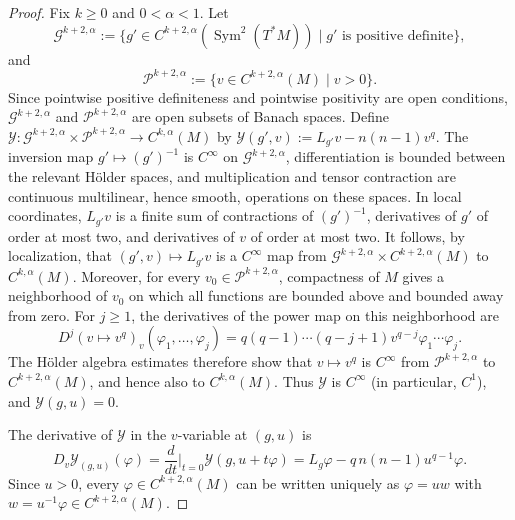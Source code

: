 \documentclass[12pt,oneside,a4paper]{article}
\theoremstyle{mytheorem}
\theoremstyle{remark}
\theoremstyle{definition}
\begin{document}
\begin{proof}
Fix \(k\ge 0\) and \(0<\alpha<1\). Let
\[
\mathcal G^{k+2,\alpha}
:=
\bigl\{g'\in C^{k+2,\alpha}(\operatorname{Sym}^2(T^*M))
\mid g' \text{ is positive definite}\bigr\},
\]
and
\[
\mathcal P^{k+2,\alpha}
:=
\bigl\{v\in C^{k+2,\alpha}(M)\mid v>0\bigr\}.
\]
Since pointwise positive definiteness and pointwise positivity are open conditions,
\(\mathcal G^{k+2,\alpha}\) and \(\mathcal P^{k+2,\alpha}\) are open subsets of Banach spaces.
Define
\(\mathcal Y\colon\mathcal G^{k+2,\alpha}\times
\mathcal P^{k+2,\alpha}\to  C^{k,\alpha}(M)\)
by
\(
\mathcal Y(g',v):=L_{g'}v-n(n-1)v^q.
\)
The inversion map $g'\mapsto(g')^{-1}$ is $C^\infty$ on
$\mathcal G^{k+2,\alpha}$, differentiation is bounded between the relevant
H\"older spaces, and multiplication and tensor contraction are continuous
multilinear, hence smooth, operations on these spaces. In local coordinates,
$L_{g'}v$ is a finite sum of contractions
of $(g')^{-1}$, derivatives of $g'$ of order at most two, and derivatives of
$v$ of order at most two. It follows, by localization, that
\((g',v)\longmapsto L_{g'}v\)
is a $C^\infty$ map from
$\mathcal G^{k+2,\alpha}\times C^{k+2,\alpha}(M)$ to $C^{k,\alpha}(M)$.
Moreover, for every $v_0\in\mathcal P^{k+2,\alpha}$, compactness of $M$ gives
a neighborhood of $v_0$ on which all functions are bounded above and bounded
away from zero. For $j\geq1$, the derivatives of the power map on this
neighborhood are
\[
D^j(v\mapsto v^q)_v(\varphi_1,\ldots,\varphi_j)
=q(q-1)\cdots(q-j+1)v^{q-j}\varphi_1\cdots\varphi_j.
\]
The H\"older algebra estimates therefore show that $v\mapsto v^q$ is
$C^\infty$ from $\mathcal P^{k+2,\alpha}$ to $C^{k+2,\alpha}(M)$, and hence
also to $C^{k,\alpha}(M)$. Thus $\mathcal Y$ is $C^\infty$ (in particular,
$C^1$), and $\mathcal Y(g,u)=0$.

The derivative of \(\mathcal Y\) in the \(v\)-variable at \((g,u)\) is
\[
D_v\mathcal Y_{(g,u)}(\varphi)
= \frac{d}{dt}\bigg|_{t=0} \mathcal Y(g,u+t\varphi)
=
L_g\varphi-q\,n(n-1)u^{q-1}\varphi.
\]
Since \(u>0\), every \(\varphi\in C^{k+2,\alpha}(M)\) can be written uniquely as
\(\varphi=uw\)
with \(w=u^{-1}\varphi\in C^{k+2,\alpha}(M)\).



\end{proof}
\end{document}
